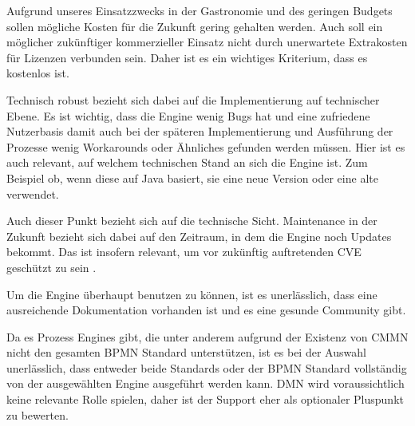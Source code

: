 \label{par:kostenlose_process_engines_auswahl}
Aufgrund unseres Einsatzzwecks in der Gastronomie und des geringen Budgets sollen mögliche Kosten für die Zukunft gering gehalten werden. Auch soll ein möglicher zukünftiger kommerzieller Einsatz nicht durch unerwartete Extrakosten für Lizenzen verbunden sein. Daher ist es ein wichtiges Kriterium, dass es kostenlos ist.

Technisch robust bezieht sich dabei auf die Implementierung auf technischer Ebene. Es ist wichtig, dass die Engine wenig Bugs hat und eine zufriedene Nutzerbasis damit auch bei der späteren Implementierung und Ausführung der Prozesse wenig Workarounds oder Ähnliches gefunden werden müssen. Hier ist es auch relevant, auf welchem technischen Stand an sich die Engine ist. Zum Beispiel ob, wenn diese auf Java basiert, sie eine neue Version oder eine alte verwendet. 

Auch dieser Punkt bezieht sich auf die technische Sicht. Maintenance in der Zukunft bezieht sich dabei auf den Zeitraum, in dem die Engine noch Updates bekommt. Das ist insofern relevant, um vor zukünftig auftretenden \acs{CVE} geschützt zu sein  \citep{mitre_cve_2024}.

Um die Engine überhaupt benutzen zu können, ist es unerlässlich, dass eine ausreichende Dokumentation vorhanden ist und es eine gesunde Community gibt.

Da es Prozess Engines gibt, die unter anderem aufgrund der Existenz von \ac{CMMN} nicht den gesamten \ac{BPMN} Standard unterstützen, ist es bei der Auswahl unerlässlich, dass entweder beide Standards oder der \ac{BPMN} Standard vollständig von der ausgewählten Engine ausgeführt werden kann. \ac{DMN} wird voraussichtlich keine relevante Rolle spielen, daher ist der Support eher als optionaler Pluspunkt zu bewerten.

